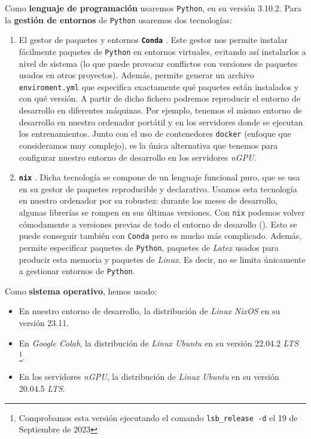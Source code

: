 Como \textbf{lenguaje de programación} usaremos \lstinline{Python}, en su versión 3.10.2. Para la \textbf{gestión de entornos} de \lstinline{Python} usaremos dos tecnologías:

\begin{enumerate}
	\item El gestor de paquetes y entornos \textbf{\lstinline{Conda}} \cite{informatica:conda_web}. Este gestor nos permite instalar fácilmente paquetes de \lstinline{Python} en entornos virtuales, evitando así instalarlos a nivel de sistema (lo que puede provocar conflictos con versiones de paquetes usados en otros proyectos). Además, permite generar un archivo \lstinline{enviroment.yml} que especifica exactamente qué paquetes están instalados y con qué versión. A partir de dicho fichero podremos reproducir el entorno de desarrollo en diferentes máquinas. Por ejemplo, tenemos el mismo entorno de desarrollo en nuestro ordenador portátil y en los servidores donde se ejecutan los entrenamientos. Junto con el uso de contenedores \lstinline{docker} (enfoque que consideramos muy complejo), es la única alternativa que tenemos para configurar nuestro entorno de desarrollo en los servidores \textit{nGPU}.
	\item \textbf{\lstinline{nix}} \cite{informatica:nixos_web}. Dicha tecnología se compone de un lenguaje funcional puro, que se usa en su gestor de paquetes reproducible y declarativo. Usamos esta tecnología en nuestro ordenador por su robustez: durante los meses de desarrollo, algunas librerías se rompen en sus últimas versiones. Con \lstinline{nix} podemos volver cómodamente a versiones previas de todo el entorno de desarollo (). Esto se puede conseguir también con \lstinline{Conda} pero es mucho más complicado. Además, permite especificar paquetes de \lstinline{Python}, paquetes de \textit{Latex} usados para producir esta memoria y paquetes de \textit{Linux}. Es decir, no se limita únicamente a gestionar entornos de \lstinline{Python}.
\end{enumerate}

Como \textbf{sistema operativo}, hemos usado:

\begin{itemize}
	\item En nuestro entorno de desarrollo, la distribución de \textit{Linux} \textit{NixOS} en su versión 23.11.
	\item En \textit{Google Colab}, la distribución de \textit{Linux} \textit{Ubuntu} en su versión 22.04.2 \textit{LTS} \footnote{Comprobamos esta versión ejecutando el comando \lstinline{lsb_release -d} el 19 de Septiembre de 2023}.
	\item En los servidores \textit{nGPU}, la distribución de \textit{Linux} \textit{Ubuntu} en su versión 20.04.5 \textit{LTS}.
\end{itemize}

